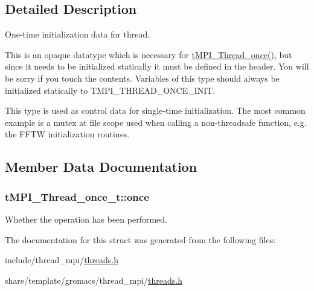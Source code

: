 \subsection{\-Detailed \-Description}
\-One-\/time initialization data for thread. 

\-This is an opaque datatype which is necessary for \hyperlink{include_2thread__mpi_2threads_8h_ac6508a9a3f1279f48b8ab0211038955c}{t\-M\-P\-I\-\_\-\-Thread\-\_\-once()}, but since it needs to be initialized statically it must be defined in the header. \-You will be sorry if you touch the contents. \-Variables of this type should always be initialized statically to \-T\-M\-P\-I\-\_\-\-T\-H\-R\-E\-A\-D\-\_\-\-O\-N\-C\-E\-\_\-\-I\-N\-I\-T.

\-This type is used as control data for single-\/time initialization. \-The most common example is a mutex at file scope used when calling a non-\/threadsafe function, e.\-g. the \-F\-F\-T\-W initialization routines. 

\subsection{\-Member \-Data \-Documentation}
\hypertarget{structtMPI__Thread__once__t_a8c9cbb7ead68bb5ed0212941ad975f0b}{
\subsubsection[{once}]{ {\bf t\-M\-P\-I\-\_\-\-Thread\-\_\-once\-\_\-t\-::once}}}\label{structtMPI__Thread__once__t_a8c9cbb7ead68bb5ed0212941ad975f0b}
\-Whether the operation has been performed. 

\-The documentation for this struct was generated from the following files\-:\begin{DoxyCompactItemize}
\item 
include/thread\-\_\-mpi/\hyperlink{include_2thread__mpi_2threads_8h}{threads.\-h}\item 
share/template/gromacs/thread\-\_\-mpi/\hyperlink{share_2template_2gromacs_2thread__mpi_2threads_8h}{threads.\-h}\end{DoxyCompactItemize}
